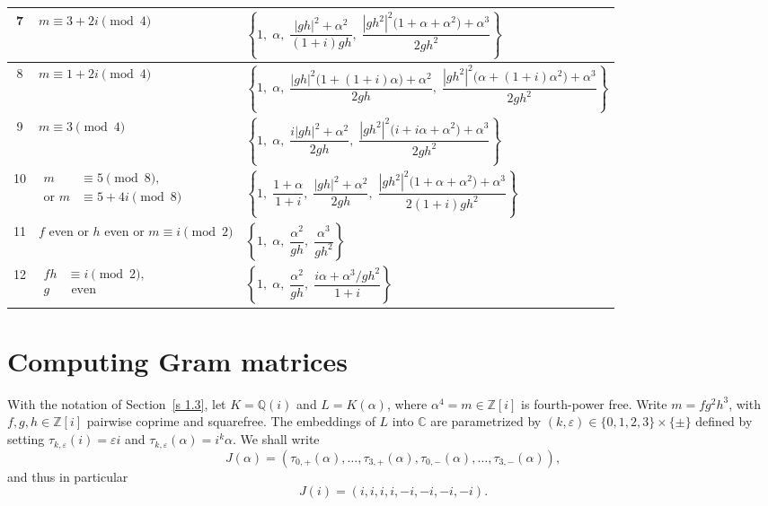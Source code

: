 \documentclass{amsart}
\newcommand{\Q}{\mathbb{Q}}
\newcommand{\C}{\mathbb{C}}
\newcommand{\Z}{\mathbb{Z}}
\theoremstyle{plain}
\theoremstyle{definition}
\theoremstyle{remark}
\numberwithin{equation}{section}
\begin{document}
\begin{table}[ht]
\begin{adjustbox}{max width=\textwidth}
\begin{tabular}{|c|p{6cm}|p{9cm}|}
\hline
7
&
$m \equiv 3+2i \pmod{4}$
&
$\left\{
1,\;
\alpha,\;
\dfrac{|gh|^{2}+\alpha^{2}}{(1+i)gh},\;
\dfrac{|gh^{2}|^{2}\bigl(1+\alpha+\alpha^{2}\bigr)+\alpha^{3}}{2gh^{2}}
\right\}$ \\
\hline
8
&
$m \equiv 1+2i \pmod{4}$
&
$\left\{
1,\;
\alpha,\;
\dfrac{|gh|^{2}\bigl(1+(1+i)\alpha\bigr)+\alpha^{2}}{2gh},\;
\dfrac{|gh^{2}|^{2}\bigl(\alpha+(1+i)\alpha^{2}\bigr)+\alpha^{3}}{2gh^{2}}
\right\}$ \\
\hline
9
&
$m \equiv 3 \pmod{4}$
&
$\left\{
1,\;
\alpha,\;
\dfrac{i|gh|^{2}+\alpha^{2}}{2gh},\;
\dfrac{|gh^{2}|^{2}\bigl(i+i\alpha+\alpha^{2}\bigr)+\alpha^{3}}{2gh^{2}}
\right\}$ \\
\hline
10
&
$\begin{aligned}
m &\equiv 5 \pmod{8},\\
\text{or } m &\equiv 5+4i \pmod{8}
\end{aligned}$
&
$\left\{
1,\;
\dfrac{1+\alpha}{1+i},\;
\dfrac{|gh|^{2}+\alpha^{2}}{2gh},\;
\dfrac{|gh^{2}|^{2}\bigl(1+\alpha+\alpha^{2}\bigr)+\alpha^{3}}{2(1+i)gh^{2}}
\right\}$ \\
\hline
11
&
$f$ even or $h$ even or $m \equiv i \pmod{2}$
&
$\left\{
1,\;
\alpha,\;
\dfrac{\alpha^{2}}{gh},\;
\dfrac{\alpha^{3}}{gh^{2}}
\right\}$ \\
\hline
12
&
$\begin{aligned}
fh &\equiv i \pmod{2},\\
g &\text{ even}
\end{aligned}$
&
$\left\{
1,\;
\alpha,\;
\dfrac{\alpha^{2}}{gh},\;
\dfrac{i\alpha+\alpha^{3}/gh^{2}}{1+i}
\right\}$ \\
\hline
\end{tabular}
\end{adjustbox}
\end{table}

\section{Computing Gram matrices}
\par
With the notation of Section~\ref{s 1.3}, let $K=\Q(i)$ and $L=K(\alpha)$, where $\alpha^4=m\in\Z[i]$ is fourth-power free. Write $m=fg^2h^3$,
with $f,g,h\in\Z[i]$ pairwise coprime and squarefree. The embeddings of $L$ into $\C$ are parametrized by $(k,\varepsilon)\in\{0,1,2,3\}\times\{\pm\}$
defined by setting $\tau_{k,\varepsilon}(i)=\varepsilon i$ and $\tau_{k,\varepsilon}(\alpha)=i^k\alpha$.
We shall write 
\[J(\alpha)=\left(\tau_{0, +}(\alpha), \dots, \tau_{3, +}(\alpha), \tau_{0, -}(\alpha), \dots, \tau_{3, -}(\alpha)\right),\] and thus in particular
\[J(i)=\left(i,i,i,i, -i, -i, -i, -i\right).\]
\end{document}
